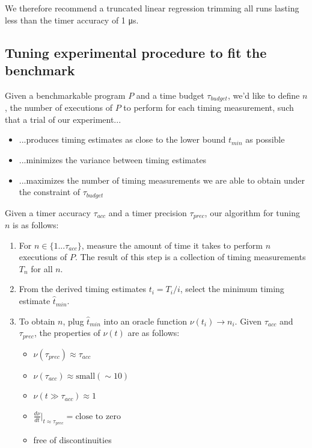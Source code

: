 \documentclass[conference]{IEEEtran}
\begin{document}
We therefore recommend a truncated linear regression trimming all runs lasting less than the timer accuracy of 1 μs.



\label{sec:tuningprotocol}
\subsection{Tuning experimental procedure to fit the benchmark}

Given a benchmarkable program $P$ and a time budget $\tau_{budget}$, we'd like to define $n$, the number of executions of $P$ to perform for each timing measurement, such that a trial of our experiment...

\begin{itemize}
    \item ...produces timing estimates as close to the lower bound $t_{min}$ as possible
    \item ...minimizes the variance between timing estimates
    \item ...maximizes the number of timing measurements we are able to obtain under the constraint of $\tau_{budget}$
\end{itemize}

Given a timer accuracy $\tau_{acc}$ and a timer precision $\tau_{prec}$, our algorithm for tuning $n$ is as follows:

\begin{enumerate}
\item For $n \in \{1...\tau_{acc}\}$, measure the amount of time it takes to perform $n$ executions of $P$. The result of this step is a collection of timing measurements $T_n$ for all $n$.
\item From the derived timing estimates $t_i = T_i / i$, select the minimum timing estimate $\hat{t}_{min}$.
\item To obtain $n$, plug $\hat{t}_{min}$ into an oracle function $\nu(t_i) \to n_i$. Given $\tau_{acc}$ and $\tau_{prec}$, the properties of $\nu(t)$ are as follows:
\begin{itemize}
    \item $\nu(\tau_{prec}) \approx \tau_{acc}$
    \item $\nu(\tau_{acc}) \approx \text{small} (\sim 10)$
    \item $\nu(t \gg \tau_{acc}) \approx 1$
    \item $\frac{d\nu}{dt}\big|_{t \approx \tau_{prec}} = \text{close to zero}$
    \item free of discontinuities 
\end{itemize}
\end{enumerate}
\end{document}

